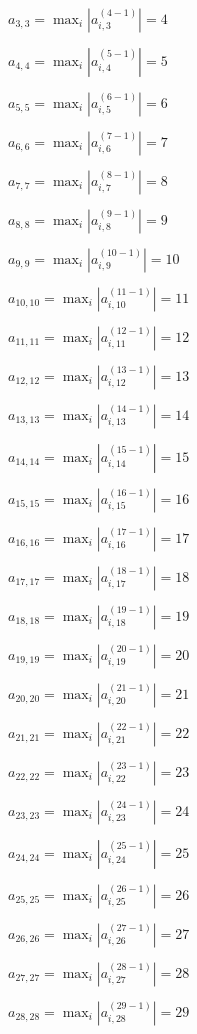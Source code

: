 \documentclass[a4paper,12pt]{article}
\begin{document}
$a _{ 3, 3 } =  \max _i |a _{ i, 3 } ^{ (4 - 1) } | = 4$

$a _{ 4, 4 } =  \max _i |a _{ i, 4 } ^{ (5 - 1) } | = 5$

$a _{ 5, 5 } =  \max _i |a _{ i, 5 } ^{ (6 - 1) } | = 6$

$a _{ 6, 6 } =  \max _i |a _{ i, 6 } ^{ (7 - 1) } | = 7$

$a _{ 7, 7 } =  \max _i |a _{ i, 7 } ^{ (8 - 1) } | = 8$

$a _{ 8, 8 } =  \max _i |a _{ i, 8 } ^{ (9 - 1) } | = 9$

$a _{ 9, 9 } =  \max _i |a _{ i, 9 } ^{ (10 - 1) } | = 10$

$a _{ 10, 10 } =  \max _i |a _{ i, 10 } ^{ (11 - 1) } | = 11$

$a _{ 11, 11 } =  \max _i |a _{ i, 11 } ^{ (12 - 1) } | = 12$

$a _{ 12, 12 } =  \max _i |a _{ i, 12 } ^{ (13 - 1) } | = 13$

$a _{ 13, 13 } =  \max _i |a _{ i, 13 } ^{ (14 - 1) } | = 14$

$a _{ 14, 14 } =  \max _i |a _{ i, 14 } ^{ (15 - 1) } | = 15$

$a _{ 15, 15 } =  \max _i |a _{ i, 15 } ^{ (16 - 1) } | = 16$

$a _{ 16, 16 } =  \max _i |a _{ i, 16 } ^{ (17 - 1) } | = 17$

$a _{ 17, 17 } =  \max _i |a _{ i, 17 } ^{ (18 - 1) } | = 18$

$a _{ 18, 18 } =  \max _i |a _{ i, 18 } ^{ (19 - 1) } | = 19$

$a _{ 19, 19 } =  \max _i |a _{ i, 19 } ^{ (20 - 1) } | = 20$

$a _{ 20, 20 } =  \max _i |a _{ i, 20 } ^{ (21 - 1) } | = 21$

$a _{ 21, 21 } =  \max _i |a _{ i, 21 } ^{ (22 - 1) } | = 22$

$a _{ 22, 22 } =  \max _i |a _{ i, 22 } ^{ (23 - 1) } | = 23$

$a _{ 23, 23 } =  \max _i |a _{ i, 23 } ^{ (24 - 1) } | = 24$

$a _{ 24, 24 } =  \max _i |a _{ i, 24 } ^{ (25 - 1) } | = 25$

$a _{ 25, 25 } =  \max _i |a _{ i, 25 } ^{ (26 - 1) } | = 26$

$a _{ 26, 26 } =  \max _i |a _{ i, 26 } ^{ (27 - 1) } | = 27$

$a _{ 27, 27 } =  \max _i |a _{ i, 27 } ^{ (28 - 1) } | = 28$

$a _{ 28, 28 } =  \max _i |a _{ i, 28 } ^{ (29 - 1) } | = 29$
\end{document}
